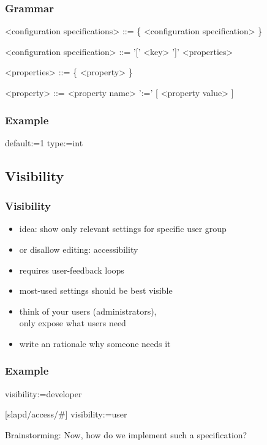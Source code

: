\begin{frame}[fragile]
	\frametitle{Grammar}
	\begin{grammar}
	<configuration specifications> ::= \{ <configuration specification> \}

	<configuration specification> ::= '[' <key> ']' <properties>

	<properties> ::= \{ <property> \}

	<property> ::= <property name> ':=' [ <property value> ]
	\end{grammar}
\end{frame}


\begin{frame}[fragile]
	\frametitle{Example}
	\begin{code}
	default:=1
	type:=int
	\end{code}
\end{frame}

\subsection{Visibility}

\begin{frame}
	\frametitle{Visibility}
	\begin{itemize}
	\item idea: show only relevant settings for specific user group
	\item or disallow editing: accessibility
	\pause
	\item requires user-feedback loops~\cite{xu2015hey}
	\item most-used settings should be best visible
	\item think of your users (administrators), \\ only expose what users need
	\item write an rationale why someone needs it
	\end{itemize}
\end{frame}

\begin{frame}[fragile]
	\frametitle{Example}
	\begin{code}
	visibility:=developer

	[slapd/access/#]
	visibility:=user
	\end{code}
\end{frame}


\begin{assignment}
	\begin{task}
	Brainstorming: Now, how do we implement such a specification?
	\end{task}
\end{assignment}

